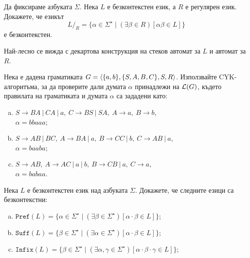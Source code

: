 \begin{problem}
  Да фиксираме азбуката $\Sigma$.
  Нека $L$ е безконтекстен език, а $R$ е регулярен език.
  Докажете, че езикът
  \[L/_{R} = \{\alpha \in \Sigma^\star \mid (\exists \beta \in R)[\alpha \beta \in L]\}\]
  е безконтекстен.
\end{problem}
\ifhints
\begin{hint}
  Най-лесно се вижда с декартова конструкция на стеков автомат за $L$ и автомат за $R$.
\end{hint}
\fi

\begin{problem}
  Нека е дадена граматиката $G = \langle{\{a,b\}, \{S,A,B,C\},S,R}\rangle$.
  Използвайте CYK-алгоритъма, за да проверите дали
  думата $\alpha$ принадлежи на $\mathcal{L}(G)$, където правилата на граматиката и думата $\alpha$
  са зададени като:
  \begin{enumerate}[a)]
  \item
    $S \to BA\ |\ CA\ |\ a,\ C\to BS\ |\ SA,\ A\to a,\ B\to b$,\\
    $\alpha=bbaaa$;
  \item
    $S \to AB\ |\ BC,\ A\to BA\ |\ a,\ B\to CC\ |\ b,\ C\to AB\ |\ a$,\\
    $\alpha=baaba$;
  \item
    $S \to AB,\ A\to AC\ |\ a\ |\ b,\ B\to CB\ |\ a,\ C\to a$,\\
    $\alpha=babaa$.
  \end{enumerate}
\end{problem}

\begin{problem}
  Нека $L$ е безконтекстен език над азбуката $\Sigma$.
  Докажете, че следните езици са безконтекстни:
  \begin{enumerate}[a)]
  \item 
    $\texttt{Pref}(L) = \{\alpha \in \Sigma^\star \mid (\exists \beta \in \Sigma^\star)[\alpha\cdot\beta \in L]\}$;
  \item 
    $\texttt{Suff}(L) = \{\beta \in \Sigma^\star \mid (\exists \alpha \in \Sigma^\star)[\alpha\cdot\beta \in L]\}$;
  \item
    $\texttt{Infix}(L) = \{\beta \in \Sigma^\star \mid (\exists \alpha,\gamma \in \Sigma^\star)[\alpha \cdot \beta \cdot \gamma \in L]\}$;
  \end{enumerate}
\end{problem}

